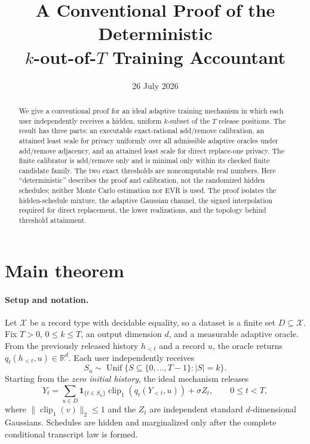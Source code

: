 \documentclass[11pt]{article}
\title{A Conventional Proof of the Deterministic\\
$k$-out-of-$T$ Training Accountant}
\author{}
\date{26 July 2026}
\theoremstyle{remark}
\newcommand{\R}{\mathbb{R}}
\newcommand{\clip}{\operatorname{clip}_1}
\begin{document}
\maketitle

\begin{abstract}
We give a conventional proof for an ideal adaptive training mechanism in
which each user independently receives a hidden, uniform $k$-subset of the
$T$ release positions.  The result has three parts: an executable
exact-rational add/remove calibration, an attained least scale for privacy
uniformly over all admissible adaptive oracles under add/remove adjacency, and
an attained least scale for direct replace-one privacy.  The finite
calibrator is add/remove only and is minimal only within its checked finite
candidate family.  The two exact thresholds are noncomputable real numbers.
Here ``deterministic'' describes the proof and calibration, not the randomized
hidden schedules; neither Monte Carlo estimation nor EVR is used.
The proof isolates the hidden-schedule mixture, the adaptive Gaussian channel,
the signed interpolation required for direct replacement, the lower
realizations, and the topology behind threshold attainment.
\end{abstract}

\section{Main theorem}

\paragraph{Setup and notation.}
Let $\mathcal X$ be a record type with decidable equality, so a dataset is a
finite set $D\subseteq\mathcal X$.  Fix $T>0$, $0\leq k\leq T$, an output
dimension $d$, and a measurable adaptive oracle.  From the previously released
history $h_{<t}$ and a record $u$, the oracle returns
$q_t(h_{<t},u)\in\R^d$.  Each user independently receives
\[
  S_u\sim\operatorname{Unif}
  \{S\subseteq\{0,\ldots,T-1\}:|S|=k\}.
\]
Starting from the \emph{zero initial history}, the ideal mechanism releases
\begin{equation}\label{eq:release}
  Y_t=\sum_{u\in D}\mathbf1_{\{t\in S_u\}}
       \clip\!\left(q_t(Y_{<t},u)\right)+\sigma Z_t,
  \qquad 0\leq t<T,
\end{equation}
where $\|\clip(v)\|_2\leq1$ and the $Z_t$ are independent standard
$d$-dimensional Gaussians.  Schedules are hidden and marginalized only after
the complete conditional transcript law is formed.
\end{document}
